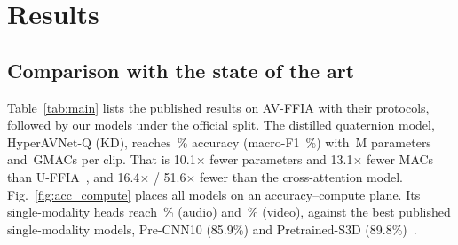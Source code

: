 \section{Results}
\label{sec:results}

\subsection{Comparison with the state of the art}
\label{sec:main}
Table~\ref{tab:main} lists the published results on AV-FFIA with their protocols, followed by our models
under the official split. The distilled quaternion model, HyperAVNet-Q (KD), reaches
\resOurAcc\,\% accuracy (macro-F1 \resOurFone\,\%) with \resOurParams\,M parameters and
\resOurGMACs\,GMACs per clip. That is 10.1$\times$ fewer parameters and 13.1$\times$ fewer MACs than
U-FFIA~\cite{cui2024uffia}, and 16.4$\times$ / 51.6$\times$ fewer than the cross-attention model.
Fig.~\ref{fig:acc_compute} places all models on an accuracy--compute plane.
Its single-modality heads reach \resOurAccA\,\% (audio) and \resOurAccV\,\% (video), against the
best published single-modality models, Pre-CNN10 (85.9\%) and Pretrained-S3D (89.8\%)~\cite{cui2024uffia}.

\begin{table}[t]
  \centering
  \caption{Comparison on AV-FFIA. Compute is in GMACs per 2\,s clip; U-FFIA's ``FLOPs'' are MACs.
  Published numbers are quoted with their own protocol and are not directly comparable across
  protocols. $^\dagger$Not verified against the full paper (taken from secondary sources). Our
  rows: official split, mean $\pm$ std over three seeds.}
  \label{tab:main}
  \small
  \resizebox{\textwidth}{!}{}
\end{table}

